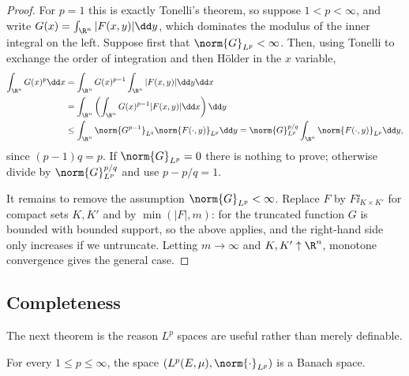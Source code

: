 \begin{proof}
	For $p = 1$ this is exactly Tonelli's theorem, so suppose $1 < p < \infty$, and write $G(x) = \int_{\R^n}|F(x,y)|\dd y$, which dominates the modulus of the inner integral on the left. Suppose first that $\norm{G}_{L^p} < \infty$. Then, using Tonelli to exchange the order of integration and then H\"older in the $x$ variable,
	\begin{align*}
		\int_{\R^n} G(x)^p \dd x &= \int_{\R^n}G(x)^{p-1}\int_{\R^n}|F(x,y)|\dd y \dd x \\
		&= \int_{\R^n}\left( \int_{\R^n}G(x)^{p-1}|F(x,y)|\dd x\right)\dd y \\
		&\le \int_{\R^n}\norm{G^{p-1}}_{L^q}\norm{F(\cdot,y)}_{L^p}\dd y = \norm{G}_{L^p}^{p/q}\int_{\R^n}\norm{F(\cdot,y)}_{L^p}\dd y,
	\end{align*}
	since $(p-1)q = p$. If $\norm{G}_{L^p} = 0$ there is nothing to prove; otherwise divide by $\norm{G}_{L^p}^{p/q}$ and use $p - p/q = 1$.

	It remains to remove the assumption $\norm{G}_{L^p}<\infty$. Replace $F$ by $F\ii_{K \times K'}$ for compact sets $K, K'$ and by $\min(|F|, m)$: for the truncated function $G$ is bounded with bounded support, so the above applies, and the right-hand side only increases if we untruncate. Letting $m \to \infty$ and $K, K' \uparrow \R^n$, monotone convergence gives the general case.
\end{proof}

\subsection{Completeness}

The next theorem is the reason $L^p$ spaces are useful rather than merely definable.

\begin{theorem}\label{thm:rieszfischer}
	For every $1 \le p \le \infty$, the space $(L^p(E,\mu), \norm{\cdot}_{L^p})$ is a Banach space.
\end{theorem}


